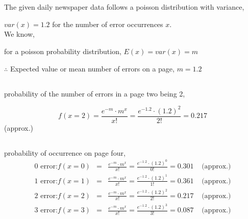 \documentclass{article}
\begin{document}
\section{}
\renewcommand\thesubsection{\alph {subsection}}
\Large{
    \hspace{1.5em}The given daily newspaper data follows a poisson distribution with variance,

    \hspace{1.5em}$var(x)=1.2$ for the number of error occurrences $x$.\\

    \hspace{1.5em}We know,

    \hspace{1.5em}for a poisson probability distribution, $E(x) = var(x) = m$

    \hspace{1.5em}$\therefore$ Expected value or mean number of errors on a page, $m= 1.2$

    \vspace{1cm}

    \subsection{} probability of the number of errors in a page two being 2,

    $$f(x=2) = \frac{e^{-m}\cdot m^x}{x!} = \frac{e^{-1.2}\cdot (1.2)^2}{2!} = 0.217$$
    \hspace{13cm}(approx.)
    \vspace{2cm}

    \subsection{} probability of occurrence on page four,
    \begin{eqnarray*}
        \text{0 error:} f(x=0) &=& \frac{e^{-m}\cdot m^x}{x!} = \frac{e^{-1.2}\cdot (1.2)^0}{0!} = 0.301 \;\;\;\;\text{(approx.)}\\
        \text{1 error:} f(x=1) &=& \frac{e^{-m}\cdot m^x}{x!} = \frac{e^{-1.2}\cdot (1.2)^1}{1!} = 0.361 \;\;\;\;\text{(approx.)}\\
        \text{2 error:} f(x=2) &=& \frac{e^{-m}\cdot m^x}{x!} = \frac{e^{-1.2}\cdot (1.2)^2}{2!} = 0.217 \;\;\;\;\text{(approx.)}\\
        \text{3 error:} f(x=3) &=& \frac{e^{-m}\cdot m^x}{x!} = \frac{e^{-1.2}\cdot (1.2)^3}{3!} = 0.087 \;\;\;\;\text{(approx.)}\\
    \end{eqnarray*}

}
\end{document}
